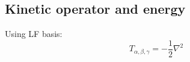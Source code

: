 \subsection{Kinetic operator and energy}

Using LF basis:
\begin{equation}
T_{\alpha,\beta,\gamma} = -\frac{1}{2}\nabla^2
\end{equation}


